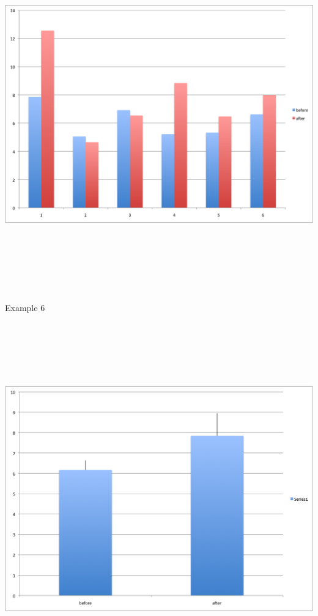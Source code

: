 \documentclass[12pt]{article}
\newcommand{\headsize}{\fontsize{35}{35} \selectfont}
\begin{document}
\centerline{\includegraphics[height=6in]{Figs/fig6r_e.png}}


\newpage


\headsize \color{myyellow}
\hfill \begin{minipage}{5.75in}
\centering
Example 6
\end{minipage}

\vspace{30mm}

\centerline{\includegraphics[height=6in]{Figs/fig6r_f.png}}
\end{document}
